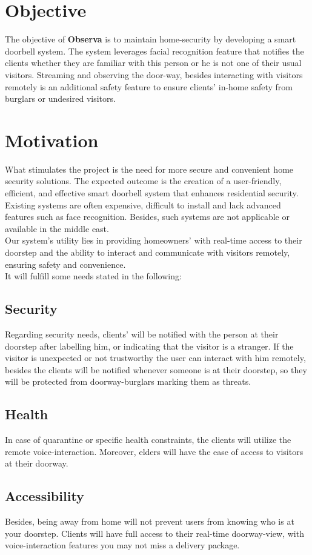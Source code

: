 \documentclass[a4 paper, 12pt]{article}
\begin{document}
\section{Objective}
The objective of \textbf{Observa} is to maintain home-security by developing a smart doorbell system. The system leverages facial recognition feature that notifies the clients whether they are familiar with this person or he is not one of their usual visitors. Streaming and observing the door-way, besides interacting with visitors remotely is an additional safety feature to ensure clients' in-home safety from burglars or undesired visitors.

\section{Motivation}
What stimulates the project is the need for more secure and convenient home security solutions. The expected outcome is the creation of a user-friendly, efficient, and effective smart doorbell system that enhances residential security. Existing systems are often expensive, difficult to install and lack advanced features such as face recognition. Besides, such systems are not applicable or available in the middle east.\\
Our system's utility lies in providing homeowners' with real-time access to their doorstep and the ability to interact and communicate with visitors remotely, ensuring safety and convenience.\\
It will fulfill some needs stated in the following:
\subsection{Security}
Regarding security needs, clients' will be notified with the person at their doorstep after labelling him, or indicating that the visitor is a stranger.
If the visitor is unexpected or not trustworthy the user can interact with him remotely, besides the clients will be notified whenever someone is at their doorstep, so they will be protected from doorway-burglars marking them as threats.
\subsection{Health}
In case of quarantine or specific health constraints, the clients will utilize the remote voice-interaction. Moreover, elders will have the ease of access to visitors at their doorway.
\subsection{Accessibility}
Besides, being away from home will not prevent users from knowing who is at your doorstep. Clients will have full access to their real-time doorway-view, with voice-interaction features you may not miss a delivery package.
\end{document}
